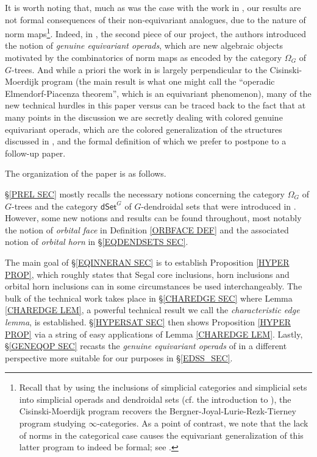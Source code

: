 \documentclass[a4paper,10pt
,draft
]{article}%
\begin{document}
It is worth noting that, much as was the case with the work in \cite{Per17}, our results are not formal consequences of their non-equivariant analogues, due to the nature of norm maps\footnote{Recall that by using the inclusions of simplicial categories and simplicial sets into simplicial operads and dendroidal sets (cf. the introduction to \cite{CM13b}), the Cisinski-Moerdijk program recovers the Bergner-Joyal-Lurie-Rezk-Tierney program studying $\infty$-categories. As a point of contrast, we note that the lack of norms in the categorical case causes the equivariant generalization of this latter program to indeed be formal; see \cite{Ste16,Ber17}.}.
Indeed, in \cite{BP17}, the second piece of our project,
the authors introduced the notion of 
\textit{genuine equivariant operads},
which are new algebraic objects motivated by the combinatorics of norm maps as encoded by the category $\Omega_G$ of $G$-trees.
And while a priori the work in \cite{BP17} is largely perpendicular to the Cisinski-Moerdijk program
(the main result \cite[Thm. III]{BP17} is what one might call the 
``operadic Elmendorf-Piacenza theorem'', which is an equivariant phenomenon),
many of the new technical hurdles in this paper versus \cite{CM13a} can be traced back to the fact that
at many points in the discussion we are secretly dealing with colored genuine equivariant operads, 
which are the colored generalization of the structures discussed in \cite{BP17},
and the formal definition of which we prefer to postpone to a follow-up paper.

\vskip 10pt

The organization of the paper is as follows.

\S \ref{PREL SEC} mostly recalls the necessary notions concerning the category $\Omega_G$ of $G$-trees and the category $\mathsf{dSet}^G$ of $G$-dendroidal sets 
that were introduced in \cite{Per17}.
However, some new notions and results can be found throughout, most notably the notion of \textit{orbital face} in Definition \ref{ORBFACE DEF}
and the associated notion of \textit{orbital horn} in 
\S \ref{EQDENDSETS SEC}.

The main goal of \S \ref{EQINNERAN SEC} is to establish
Proposition \ref{HYPER PROP},
which roughly states that Segal core inclusions, horn inclusions and orbital horn inclusions can in some circumstances be used interchangeably.
The bulk of the technical work takes place in 
\S \ref{CHAREDGE SEC} where Lemma \ref{CHAREDGE LEM},
a powerful technical result we call the
\textit{characteristic edge lemma}, is established.
\S \ref{HYPERSAT SEC} then shows Proposition \ref{HYPER PROP} via a string of easy applications of 
Lemma \ref{CHAREDGE LEM}.
Lastly, \S \ref{GENEQOP SEC} recasts the \textit{genuine equivariant operads} of \cite{BP17} in a different perspective more suitable for our purposes in \S \ref{EDSS_SEC}.
\end{document}
